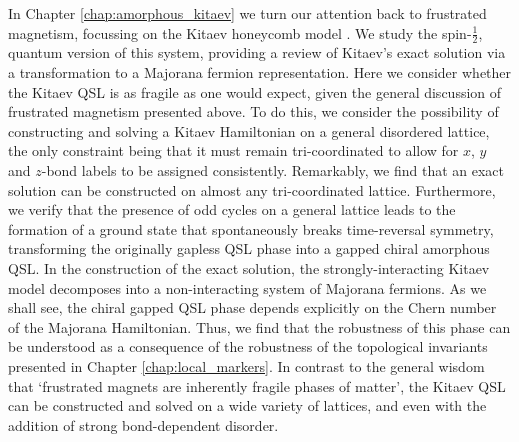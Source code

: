 In Chapter \ref{chap:amorphous_kitaev} we turn our attention back to frustrated magnetism, focussing on the Kitaev honeycomb model \cite{kitaev_anyons_2006}. We study the spin-$\frac 12$, quantum version of this system, providing a review of Kitaev's exact solution via a transformation to a Majorana fermion representation. Here we consider whether the Kitaev QSL is as fragile as one would expect, given the general discussion of frustrated magnetism presented above. To do this, we consider the possibility of constructing and solving a Kitaev Hamiltonian on a general disordered lattice, the only constraint being that it must remain tri-coordinated to allow for $x$, $y$ and $z$-bond labels to be assigned consistently. Remarkably, we find that an exact solution can be constructed on almost any tri-coordinated lattice. Furthermore, we verify that the presence of odd cycles on a general lattice leads to the formation of a ground state that spontaneously breaks time-reversal symmetry, transforming the originally gapless QSL phase into a gapped chiral amorphous QSL. In the construction of the exact solution, the strongly-interacting Kitaev model decomposes into a non-interacting system of Majorana fermions. As we shall see, the chiral gapped QSL phase depends explicitly on the Chern number of the Majorana Hamiltonian. Thus, we find that the robustness of this phase can be understood as a consequence of the robustness of the topological invariants presented in Chapter \ref{chap:local_markers}. In contrast to the general wisdom that `frustrated magnets are inherently fragile phases of matter', the Kitaev QSL can be constructed and solved on a wide variety of lattices, and even with the addition of strong bond-dependent disorder.

